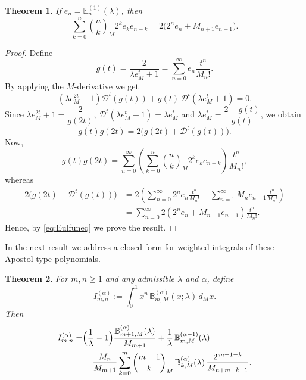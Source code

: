 \documentclass[12pt, a4paper]{article}
\newtheorem{theorem}{Theorem}[section]
\theoremstyle{definition}
\numberwithin{equation}{section}
\newcommand{\B}{\mathbb{B}}
\newcommand{\E}{\mathbb{E}}
\begin{document}
\begin{theorem}
If $e_n = \E_n^{(1)}(\lambda)$, then
\[
\sum_{k=0}^{n}\binom{n}{k}_M2^ke_ke_{n-k} = 2\bigl(2^ne_n+M_{n+1}e_{n-1}\bigr).
\]
\end{theorem}
\begin{proof}
Define
\[
g(t)=\frac{2}{\lambda e_M^t+1}=\sum_{n=0}^\infty e_n\frac{t^n}{M_n!}.
\]
By applying the $M$-derivative we get
\[
(\lambda e_M^{2t}+1)\mathcal D^t(g(t)) + g(t)\,\mathcal D^t(\lambda e_M^t+1)=0.
\]
Since $\lambda e_M^{2t}+1=\dfrac{2}{g(2t)}$, $\mathcal D^t(\lambda e_M^t+1)=\lambda e_M^t$ and $\lambda e_M^t=\dfrac{2-g(t)}{g(t)}$, we obtain
\begin{equation}\label{eq:Eulfuneq}
g(t)g(2t) = 2\bigl(g(2t)+ \mathcal{D}^t(g(t))\bigr).
\end{equation}
Now,
\[
g(t)g(2t) = \sum_{n=0}^{\infty}\left(\sum_{k=0}^{n}\binom{n}{k}_M2^ke_ke_{n-k}\right)\frac{t^n}{M_n!},
\]
whereas
\begin{align*}
2\bigl(g(2t)+ \mathcal{D}^t(g(t))\bigr) &= 2\left(\sum_{n=0}^{\infty}2^ne_n\frac{t^n}{M_n!} + \sum_{n=1}^{\infty}M_ne_{n-1}\frac{t^n}{M_n!}\right)\\
&= \sum_{n=0}^{\infty}2\left(2^ne_n+M_{n+1}e_{n-1}\right)\frac{t^n}{M_n!}.
\end{align*}
Hence, by \eqref{eq:Eulfuneq} we prove the result.
\end{proof}

In the next result we address a closed form for weighted integrals of these Apostol-type polynomials.

\begin{theorem}\label{thm:int-bernoulli-recurrence}
For $m,n\ge 1$ and any admissible $\lambda$ and $\alpha$, define
\[
I_{m,n}^{(\alpha)}:=\int_0^1 x^n\,\B_{m,M}^{(\alpha)}(x;\lambda)\,d_M x.
\]
Then
\begin{equation}\label{eq:bernoulli-recurrence}
\begin{aligned}
I_{m,n}^{(\alpha)} = &\Bigl(\frac{1}{\lambda}-1\Bigr)\frac{\B_{m+1,M}^{(\alpha)}(\lambda)}{M_{m+1}}
      +\frac{1}{\lambda}\,\B_{m,M}^{(\alpha-1)}(\lambda) \\
     &- \frac{M_n}{M_{m+1}}\sum_{k=0}^{m}\binom{m+1}{k}_M\,
        \B_{k,M}^{(\alpha)}(\lambda)\,\frac{2^{\,m+1-k}}{M_{n+m-k+1}}.
\end{aligned}
\end{equation}
\end{theorem}
\end{document}
